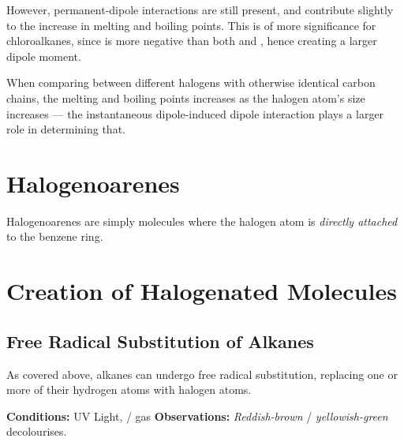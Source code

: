 			However, permanent-dipole interactions are still present, and contribute slightly to the increase in melting and boiling points.
			This is of more significance for chloroalkanes, since \ch{\chlorine} is more negative than both  and , hence creating
			a larger dipole moment.

			When comparing between different halogens with otherwise identical carbon chains, the melting and boiling points increases as
			the halogen atom's size increases –– the instantaneous dipole-induced dipole interaction plays a larger role in determining
			that.



	\pagebreak
	\section{Halogenoarenes}

		Halogenoarenes are simply molecules where the halogen atom is \textit{directly attached} to the benzene ring.





	\section{Creation of Halogenated Molecules}

		\subsection{Free Radical Substitution of Alkanes}

			As covered above, alkanes can undergo free radical substitution, replacing one or more of their hydrogen atoms with halogen
			atoms.

			\vspace{1.5em}

			\vbox{\textbf{Conditions:} \tabto{35mm}UV Light,  /  gas}	%
			\vbox{\textbf{Observations:} \tabto{35mm}\textit{\color{Mahogany}Reddish-brown}  / \textit{\color{YellowGreen}yellowish-green}  decolourises.}

